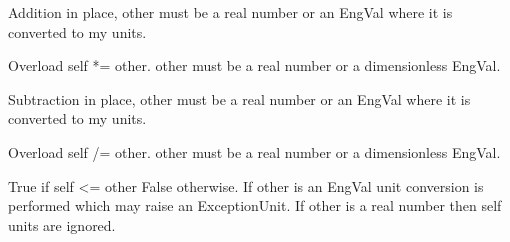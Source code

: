 \documentclass[letterpaper,10pt,english]{sphinxmanual}
\begin{document}
\begin{fulllineitems}
\begin{fulllineitems}
\end{fulllineitems}


\begin{fulllineitems}
\label{\detokenize{ref/LIS/core/EngVal:TotalDepth.LIS.core.EngVal.EngVal.__iadd__}}
Addition in place, other must be a real number or an EngVal where
it is converted to my units.

\end{fulllineitems}


\begin{fulllineitems}
\label{\detokenize{ref/LIS/core/EngVal:TotalDepth.LIS.core.EngVal.EngVal.__imul__}}
Overload self *= other. other must be a real number or a dimensionless EngVal.

\end{fulllineitems}


\begin{fulllineitems}
\label{\detokenize{ref/LIS/core/EngVal:TotalDepth.LIS.core.EngVal.EngVal.__isub__}}
Subtraction in place, other must be a real number or an EngVal where
it is converted to my units.

\end{fulllineitems}


\begin{fulllineitems}
\label{\detokenize{ref/LIS/core/EngVal:TotalDepth.LIS.core.EngVal.EngVal.__itruediv__}}
Overload self /= other. other must be a real number or a dimensionless EngVal.

\end{fulllineitems}


\begin{fulllineitems}
\label{\detokenize{ref/LIS/core/EngVal:TotalDepth.LIS.core.EngVal.EngVal.__le__}}
True if self \textless{}= other False otherwise.
If other is an EngVal unit conversion is performed which may raise an ExceptionUnit.
If other is a real number then self units are ignored.


\end{fulllineitems}
\end{fulllineitems}
\end{document}

